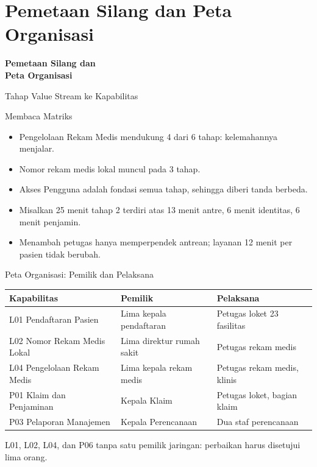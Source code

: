 \documentclass[aspectratio=169, table, 12pt]{beamer}
\begin{document}
\section{Pemetaan Silang dan Peta Organisasi}

\begin{frame}{\hfill}
  \centering
  \Huge{\textbf{Pemetaan Silang dan\\Peta Organisasi}}
\end{frame}

\begin{frame}{{\Large Tahap Value Stream ke Kapabilitas}}
  \centering
\end{frame}

\begin{frame}{{\Large Membaca Matriks}}
  \vspace{10pt}
  \begin{itemize}
    \item Pengelolaan Rekam Medis mendukung 4 dari 6 tahap: kelemahannya menjalar.
    \item Nomor rekam medis lokal muncul pada 3 tahap.
    \item Akses Pengguna adalah fondasi semua tahap, sehingga diberi tanda berbeda.
    \item Misalkan 25 menit tahap 2 terdiri atas 13 menit antre, 6 menit identitas, 6 menit penjamin.
    \item Menambah petugas hanya memperpendek antrean; layanan 12 menit per pasien tidak berubah.
  \end{itemize}
\end{frame}

\begin{frame}{{\Large Peta Organisasi: Pemilik dan Pelaksana}}
  \footnotesize
  \begin{tabularx}{\textwidth}{>{\raggedright\arraybackslash}p{5.0cm}
      >{\raggedright\arraybackslash}p{3.8cm} >{\raggedright\arraybackslash}X}
    \hline
    \textbf{Kapabilitas} & \textbf{Pemilik} & \textbf{Pelaksana} \\
    \hline
    L01 Pendaftaran Pasien & Lima kepala pendaftaran & Petugas loket 23 fasilitas \\
    \hline
    L02 Nomor Rekam Medis Lokal & Lima direktur rumah sakit & Petugas rekam medis \\
    \hline
    L04 Pengelolaan Rekam Medis & Lima kepala rekam medis & Petugas rekam medis, klinis \\
    \hline
    P01 Klaim dan Penjaminan & Kepala Klaim & Petugas loket, bagian klaim \\
    \hline
    P03 Pelaporan Manajemen & Kepala Perencanaan & Dua staf perencanaan \\
    \hline
  \end{tabularx}

  \vspace{8pt}
  \small L01, L02, L04, dan P06 tanpa satu pemilik jaringan: perbaikan harus disetujui lima orang.
\end{frame}
\end{document}
